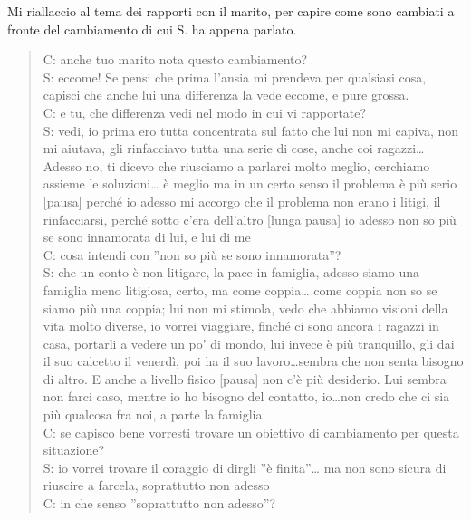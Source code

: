 \noindent Mi riallaccio al tema dei rapporti con il marito, per capire come sono cambiati a fronte del cambiamento di cui S. ha appena parlato.

\begin{verse}
C: anche tuo marito nota questo cambiamento?\\
S: eccome! Se pensi che prima l'ansia mi prendeva per qualsiasi cosa, capisci che anche lui una differenza la vede eccome, e pure grossa.\\
C: e tu, che differenza vedi nel modo in cui vi rapportate?\\
S: vedi, io prima ero tutta concentrata sul fatto che lui non mi capiva, non mi aiutava, gli rinfacciavo tutta una serie di cose, anche coi ragazzi\ldots{} Adesso no, ti dicevo che riusciamo a parlarci molto meglio, cerchiamo assieme le soluzioni\ldots{} è meglio ma in un certo senso il problema è più serio [pausa] perché io adesso mi accorgo che il problema non erano i litigi, il rinfacciarsi, perché sotto c'era dell'altro [lunga pausa] io adesso non so più se sono innamorata di lui, e lui di me\\
C: cosa intendi con ''non so più se sono innamorata''?\\
S: che un conto è non litigare, la pace in famiglia, adesso siamo una famiglia meno litigiosa, certo, ma come coppia\ldots{} come coppia non so se siamo più una coppia; lui non mi stimola, vedo che abbiamo visioni della vita molto diverse, io vorrei viaggiare, finché ci sono ancora i ragazzi in casa, portarli a vedere un po' di mondo, lui invece è più tranquillo, gli dai il suo calcetto il venerdì, poi ha il suo lavoro\ldots sembra che non senta bisogno di altro. E anche a livello fisico [pausa] non c'è più desiderio. Lui sembra non farci caso, mentre io ho bisogno del contatto, io\ldots non credo che ci sia più qualcosa fra noi, a parte la famiglia\\
C: se capisco bene vorresti trovare un obiettivo di cambiamento per questa situazione?\\
S: io vorrei trovare il coraggio di dirgli ''è finita''\ldots{} ma non sono sicura di riuscire a farcela, soprattutto non adesso\\
C: in che senso ''soprattutto non adesso''?\\

\end{verse}
